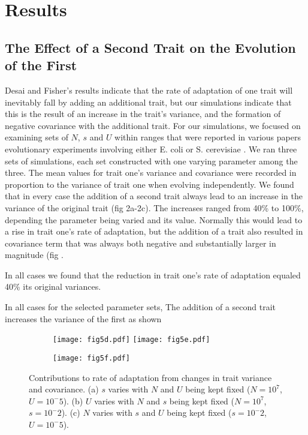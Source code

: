 \documentclass[11pt,twocolumn]{article}
\begin{document}
\section{Results}
\subsection{The Effect of a Second Trait on the Evolution of the First}
Desai and Fisher's results indicate that the rate of adaptation of one trait will inevitably fall by adding an additional trait, but our simulations indicate that this is the result of an increase in the trait's variance, and the formation of negative covariance with the additional trait. For our simulations, we focused on examining sets of $N$, $s$ and $U$ within ranges that were reported in various papers evolutionary experiments involving either E. coli or S. cerevisiae \citep{desai2007speed,Levy2015,Perfeito2007}. We ran three sets of simulations, each set constructed with one varying parameter among the three. The mean values for trait one's variance and covariance were recorded in proportion to the variance of trait one when evolving independently. We found that in every case the addition of a second trait always lead to an increase in the variance of the original trait (fig 2a-2c). The increases ranged from 40\% to 100\%, depending the parameter being varied and its value. Normally this would lead to a rise in trait one's rate of adaptation, but the addition of a trait also resulted in covariance term that was always both negative and substantially larger in magnitude (fig . 

In all cases we found that the reduction in trait one's rate of adaptation equaled 40\% its original variances.  

In all cases for the selected parameter sets, The addition of a second trait increases the variance of the first as shown 

\begin{figure}[h]
\begin{subfigure}[b]{1\linewidth}
\texttt{[image: fig5d.pdf]}
\texttt{[image: fig5e.pdf]}
\end{subfigure}

\begin{subfigure}[b]{1\linewidth}
\texttt{[image: fig5f.pdf]}
\end{subfigure}

\label{fig}
\caption{\footnotesize Contributions to rate of adaptation from changes in trait variance and covariance. (a) $s$ varies with $N$ and $U$ being kept fixed ($N= 10^7$, $U=10^-5$). (b) $U$ varies with $N$ and $s$ being kept fixed ($N= 10^7$,$s=10^-2$). (c) $N$ varies with $s$ and $U$ being kept fixed ($s=10^-2$,$U=10^-5$).}
\end{figure}
\end{document}
